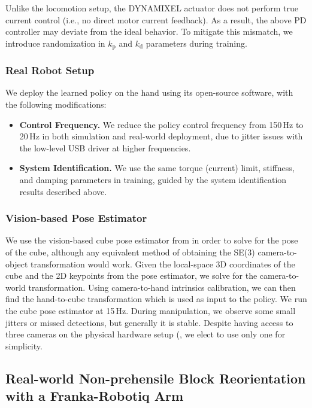 Unlike the locomotion setup, the DYNAMIXEL actuator does not perform true current control (i.e., no direct motor current feedback). As a result, the above PD controller may deviate from the ideal behavior. To mitigate this mismatch, we introduce randomization in \(k_\text{p}\) and \(k_\text{d}\) parameters during training.

\subsubsection{Real Robot Setup}
We deploy the learned policy on the hand using its open-source software, with the following modifications:
\begin{itemize}[leftmargin=1em]
    \item \textbf{Control Frequency.} We reduce the policy control frequency from 150\,Hz to 20\,Hz in both simulation and real-world deployment, due to jitter issues with the low-level USB driver at higher frequencies.
    \item \textbf{System Identification.} We use the same torque (current) limit, stiffness, and damping parameters in training, guided by the system identification results described above.
\end{itemize}

\subsubsection{Vision-based Pose Estimator}

We use the vision-based cube pose estimator from \citep{handa2023dextreme} in order to solve for the pose of the cube, although any equivalent method of obtaining the SE(3) camera-to-object transformation would work. Given the local-space 3D coordinates of the cube and the 2D keypoints from the pose estimator, we solve for the camera-to-world transformation. Using camera-to-hand intrinsics calibration, we can then find the hand-to-cube transformation which is used as input to the policy. We run the cube pose estimator at 15\,Hz. During manipulation, we observe some small jitters or missed detections, but generally it is stable. Despite having access to three cameras on the physical hardware setup (\cite{li2024_drop}, we elect to use only one for simplicity.

\clearpage


\subsection{Real-world Non-prehensile Block Reorientation with a Franka-Robotiq Arm}
\label{appendix:RealWorldNonprehensileReorientationPolicyPerformance}

